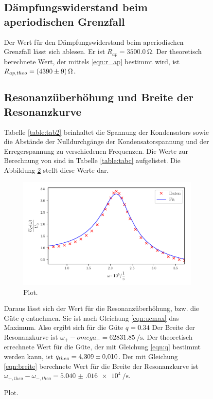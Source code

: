 \begin{figure}
\subsection{Dämpfungswiderstand beim aperiodischen Grenzfall}
Der Wert für den Dämpfungswiderstand beim aperiodischen Grenzfall
lässt sich ablesen. Er ist $R_{ap} = \SI{3500.0}{\ohm}$.
\newline
Der theoretisch berechnete Wert, der mittels \eqref{eqn:r_ap}
bestimmt wird, ist $R_{ap,theo} = \SI{4390 \pm 9}{\ohm}$.

\subsection{Resonanzüberhöhung und Breite der Resonanzkurve}
Tabelle \ref{table:tab2} beinhaltet die Spannung der Kondensators
sowie die Abstände der Nulldurchgänge der Kondensatorspannung
und der Erregerspannung zu verschiedenen Frequenzen.
Die Werte zur Berechnung von %
sind in Tabelle \ref{table:tabc} aufgelistet.
Die Abbildung \ref{fig:plotc} stellt diese Werte dar.


\begin{figure}
  \centering
  \includegraphics{build/plotc.pdf}
  \caption{Plot.}
  \label{fig:plotc}
\end{figure}
\noindent Daraus lässt sich der Wert für die Resonanzüberhöhung, bzw. die Güte $q$ entnehmen.
Sie ist nach Gleichung \eqref{eqn:ucmax} das Maximum.
Also ergibt sich für die Güte $q = \num{0.34}$
Der Breite der Resonanzkurve ist
$\omega_{+} - omega_{-} = \SI[per-mode=fraction]{62831.85}{\per\second}$. %
\newline
Der theoretisch errechnete Wert für die Güte, der mit Gleichung
\eqref{eqn:q} bestimmt werden kann, ist $q_{theo} = \num{4.309 \pm.010}$.
Der mit Gleichung \eqref{eqn:breite} berechnete Wert für die Breite der
Resonanzkurve ist
$\omega_{+,theo} - \omega_{-,theo} = \SI[per-mode=fraction]{5.040(016)e4}{\per\second}$.


\end{figure}
